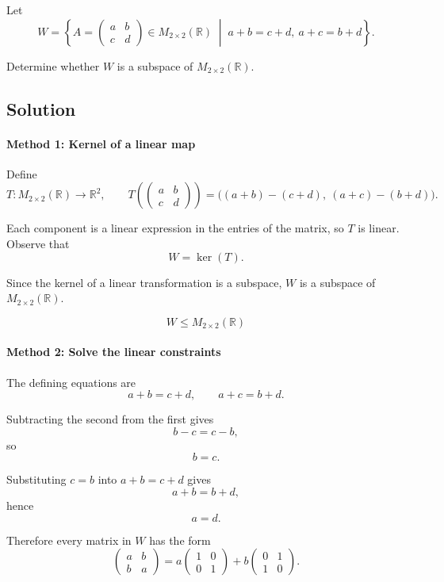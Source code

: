 \documentclass[12pt]{article}
\begin{document}
Let
\[
W=\left\{
A=\begin{pmatrix}
a&b\\ c&d
\end{pmatrix}\in M_{2\times2}(\mathbb R)
\;\middle|\;
a+b=c+d,\ a+c=b+d
\right\}.
\]

Determine whether \(W\) is a subspace of \(M_{2\times2}(\mathbb R)\).

\subsection{Solution}

\paragraph{Method 1: Kernel of a linear map}

Define
\[
T:M_{2\times2}(\mathbb R)\to\mathbb R^2,
\qquad
T\!\left(\begin{pmatrix}a&b\\ c&d\end{pmatrix}\right)
=
\bigl((a+b)-(c+d),\ (a+c)-(b+d)\bigr).
\]

Each component is a linear expression in the entries of the matrix, so \(T\) is linear. Observe that
\[
W=\ker(T).
\]

Since the kernel of a linear transformation is a subspace, \(W\) is a subspace of \(M_{2\times2}(\mathbb R)\).

\[
\boxed{W\le M_{2\times2}(\mathbb R)}
\]

\paragraph{Method 2: Solve the linear constraints}

The defining equations are
\[
a+b=c+d,
\qquad
a+c=b+d.
\]

Subtracting the second from the first gives
\[
b-c=c-b,
\]
so
\[
b=c.
\]

Substituting \(c=b\) into \(a+b=c+d\) gives
\[
a+b=b+d,
\]
hence
\[
a=d.
\]

Therefore every matrix in \(W\) has the form
\[
\begin{pmatrix}
a&b\\ b&a
\end{pmatrix}
=
a\begin{pmatrix}
1&0\\ 0&1
\end{pmatrix}
+b\begin{pmatrix}
0&1\\ 1&0
\end{pmatrix}.
\]
\end{document}
